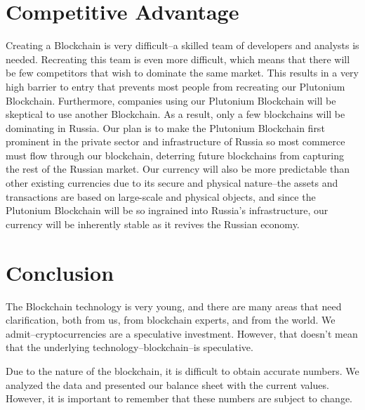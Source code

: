 \documentclass[12pt]{article}
\begin{document}
\section{Competitive Advantage}
Creating a Blockchain is very difficult--a skilled team of developers and analysts is needed. Recreating this team is even more difficult, which means that there will be few competitors that wish to dominate the same market. This results in a very high barrier to entry that prevents most people from recreating our Plutonium Blockchain. Furthermore, companies using our Plutonium Blockchain will be skeptical to use another Blockchain. As a result, only a few blockchains will be dominating in Russia. Our plan is to make the Plutonium Blockchain first prominent in the private sector and infrastructure of Russia so most commerce must flow through our blockchain, deterring future blockchains from capturing the rest of the Russian market. Our currency will also be more predictable than other existing currencies due to its secure and physical nature--the assets and transactions are based on large-scale and physical objects, and since the Plutonium Blockchain will be so ingrained into Russia's infrastructure, our currency will be inherently stable as it revives the Russian economy.
\pagebreak
\section{Conclusion}
The Blockchain technology is very young, and there are many areas that need clarification, both from us, from blockchain experts, and from the world. We admit--cryptocurrencies are a speculative investment. However, that doesn't mean that the underlying technology--blockchain--is speculative.

Due to the nature of the blockchain, it is difficult to obtain accurate numbers. We analyzed the data and presented our balance sheet with the current values. However, it is important to remember that these numbers are subject to change.
\end{document}
